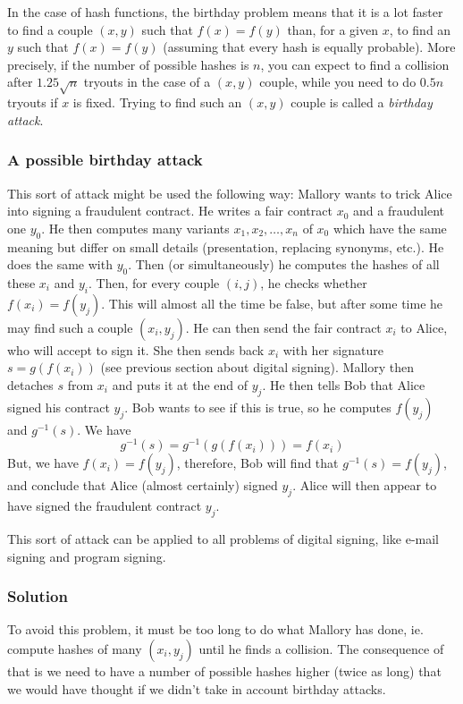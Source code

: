 \documentclass[12pt,a4paper]{article}
\begin{document}
In the case of hash functions, the birthday problem means that it is a lot faster to find a couple $(x,y)$ such that $f(x)=f(y)$ than, for a given $x$, to find an $y$ such that $f(x)=f(y)$ (assuming that every hash is equally probable). More precisely, if the number of possible hashes is $n$, you can expect to find a collision after $1.25 \sqrt{n}$ tryouts in the case of a $(x,y)$ couple, while you need to do $0.5 n$ tryouts if $x$ is fixed. Trying to find such an $(x,y)$ couple is called a {\em birthday attack}.

\subsubsection{A possible birthday attack}

This sort of attack might be used the following way: Mallory wants to trick Alice into signing a fraudulent contract. He writes a fair contract $x_0$ and a fraudulent one $y_0$. He then computes many variants $x_1, x_2, \ldots, x_n$ of $x_0$ which have the same meaning but differ on small details (presentation, replacing synonyms, etc.). He does the same with $y_0$. Then (or simultaneously) he computes the hashes of all these $x_i$ and $y_i$. Then, for every couple $(i,j)$, he checks whether $f(x_i)=f(y_j)$. This will almost all the time be false, but after some time he may find such a couple $(x_i,y_j)$. He can then send the fair contract $x_i$ to Alice, who will accept to sign it. She then sends back $x_i$ with her signature $s=g(f(x_i))$ (see previous section about digital signing). Mallory then detaches $s$ from $x_i$ and puts it at the end of $y_j$. He then tells Bob that Alice signed his contract $y_j$. Bob wants to see if this is true, so he computes $f(y_j)$ and $g^{-1}(s)$. We have
\[ g^{-1}(s) = g^{-1}(g(f(x_i))) = f(x_i) \]
But, we have $f(x_i)=f(y_j)$, therefore, Bob will find that $g^{-1}(s) = f(y_j)$, and conclude that Alice (almost certainly) signed $y_j$. Alice will then appear to have signed the fraudulent contract $y_j$.

This sort of attack can be applied to all problems of digital signing, like e-mail signing and program signing.

\subsubsection{Solution}

To avoid this problem, it must be too long to do what Mallory has done, ie. compute hashes of many $(x_i,y_j)$ until he finds a collision. The consequence of that is we need to have a number of possible hashes higher (twice as long) that we would have thought if we didn't take in account birthday attacks.
\end{document}
